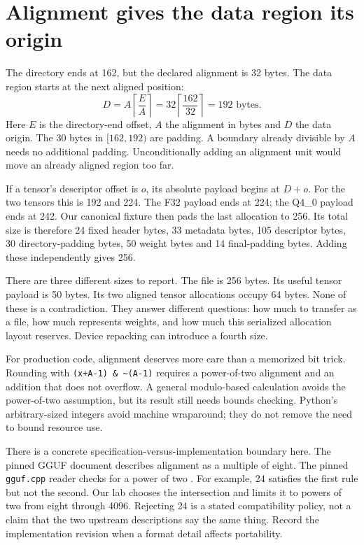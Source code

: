 \section{Alignment gives the data region its origin}
The directory ends at 162, but the declared alignment is 32 bytes.
The data region starts at the next aligned position:
\begin{equation}
D=A\left\lceil\frac{E}{A}\right\rceil
=32\left\lceil\frac{162}{32}\right\rceil=192\text{ bytes}.
\end{equation}
Here $E$ is the directory-end offset, $A$ the alignment in bytes and
$D$ the data origin. The 30 bytes in $[162,192)$ are padding.
A boundary already divisible by $A$ needs no additional
padding. Unconditionally adding an alignment unit would move an
already aligned region too far.

If a tensor's descriptor offset is $o$, its absolute payload begins
at $D+o$. For the two tensors this is 192 and 224. The F32 payload
ends at 224; the Q4\_0 payload ends at 242. Our canonical fixture
then pads the last allocation to 256. Its total size is therefore
24 fixed header bytes, 33 metadata bytes, 105 descriptor bytes,
30 directory-padding bytes, 50 weight bytes and 14 final-padding bytes.
Adding these independently gives 256.

There are three different sizes to report. The file is 256 bytes.
Its useful tensor payload is 50 bytes. Its two aligned tensor
allocations occupy 64 bytes. None of these is a contradiction.
They answer different questions: how much to transfer as a file,
how much represents weights, and how much this serialized allocation
layout reserves. Device repacking can introduce a fourth size.

For production code, alignment deserves more care than a memorized
bit trick. Rounding with \texttt{(x+A-1) \& \textasciitilde(A-1)}
requires a power-of-two alignment and an addition that does not
overflow. A general modulo-based calculation avoids the power-of-two
assumption, but its result still needs bounds checking. Python's
arbitrary-sized integers avoid machine wraparound; they do not remove
the need to bound resource use.

There is a concrete specification-versus-implementation boundary here.
The pinned GGUF document describes alignment as a multiple of eight.
The pinned \texttt{gguf.cpp} reader checks for a power of two
\cite{ggml2026ggufpinned,ggml2026loaderpinned}. For example, 24 satisfies
the first rule but not the second. Our lab chooses the intersection
and limits it to powers of two from eight through 4096. Rejecting 24
is a stated compatibility policy, not a claim that the two upstream
descriptions say the same thing. Record the implementation revision
when a format detail affects portability.

